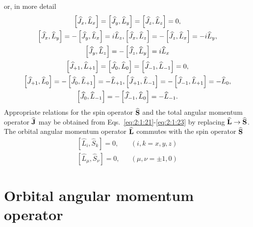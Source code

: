 or, in more detail
\begin{gather}
{\left[\widehat{J}_{x}, \widehat{L}_{x}\right]=\left[\widehat{J}_{y}, \widehat{L}_{y}\right]=\left[\widehat{J}_{z}, \widehat{L}_{z}\right]=0}  ,\notag\\
{\left[\widehat{J}_{x}, \widehat{L}_{y}\right]=-\left[\widehat{J}_{y}, \widehat{L}_{x}\right]=i \widehat{L}_{z},\left[\widehat{J}_{x}, \widehat{L}_{z}\right]=-\left[\widehat{J}_{z}, \widehat{L}_{x}\right]=-i \widehat{L}_{y}}  ,\label{eq:2:1:22}\\
{\left[\widehat{J}_{y}, \widehat{L}_{z}\right]=-\left[\widehat{J}_{z}, \widehat{L}_{y}\right]=i \widehat{L}_{x}}  \notag\\
{\left[\widehat{J}_{+1}, \widehat{L}_{+1}\right]=\left[\widehat{J}_{0}, \widehat{L}_{0}\right]=\left[\widehat{J}_{-1}, \widehat{L}_{-1}\right]=0}  ,\notag\\
{\left[\widehat{J}_{+1}, \widehat{L}_{0}\right]=-\left[\widehat{J}_{0}, \widehat{L}_{+1}\right]=-\widehat{L}_{+1},\left[\widehat{J}_{+1}, \widehat{L}_{-1}\right]=-\left[\widehat{J}_{-1}, \widehat{L}_{+1}\right]=-\widehat{L}_{0}} , \label{eq:2:1:23}\\
{\left[\widehat{J}_{0}, \widehat{L}_{-1}\right]=-\left[\widehat{J}_{-1}, \widehat{L}_{0}\right]=-\widehat{L}_{-1}} .\notag
\end{gather}
Appropriate relations for the spin operator $\widehat{\mathbf{S}}$ and the total angular momentum operator $\widehat{\mathbf{J}}$ may be obtained from Eqs.~\eqref{eq:2:1:21}-\eqref{eq:2:1:23} by replacing $\widehat{\mathbf{L}} \rightarrow \widehat{\mathbf{S}}$. The orbital angular momentum operator $\widehat{\mathbf{L}}$ commutes with the spin operator $\widehat{\mathbf{S}}$
\begin{equation}
\begin{aligned}
{\left[\widehat{L}_{i}, \widehat{S}_{k}\right]=0,} && (i, k=x, y, z) \\
{\left[\widehat{L}_{\mu}, \widehat{S}_{\nu}\right]=0,} && (\mu, \nu= \pm 1,0) \label{eq:2:1:24}
\end{aligned}
\end{equation}

\section{Orbital angular momentum operator}\label{sec:2.2}

